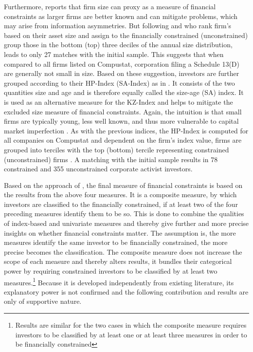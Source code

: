 \documentclass[12pt]{article}
\begin{document}
Furthermore, \citet[p.15]{heller2015} reports that firm size can proxy as a measure of financial constraints as larger firms are better known and can mitigate problems, which may arise from information asymmetries. But following \citet[p.1790]{Almeida2004} and \citet[p.215]{Moeller2004} who rank firm's based on their asset size and assign to the financially constrained (unconstrained) group those in the bottom (top) three deciles of the annual size distribution, leads to only 27 matches with the initial sample. This suggests that when compared to all firms listed on Compustat, corporation filing a Schedule 13(D) are generally not small in size. 
Based on these suggestion, investors are further grouped according to their HP-Index (SA-Index) as in \citet[p.1929]{hadlock2010}. It consists of the two quantities size and age and is therefore equally called the size-age (SA) index. It is used as an alternative measure for the KZ-Index and helps to mitigate the excluded size measure of financial constraints. Again, the intuition is that small firms are typically young, less well known, and thus more vulnerable to capital market imperfection \citep[p.1790]{Almeida2004}. As with the previous indices, the HP-Index is computed for all companies on Compustat and dependent on the firm's index value, firms are grouped into terciles with the top (bottom) tercile representing constrained (unconstrained) firms \citep[p.29]{Farre-mensa2013}. A matching with the initial sample results in 78 constrained and 355 unconstrained corporate activist investors.\par
Based on the approach of \citet[p.1188]{Campello2006}, the final measure of financial constraints is based on the results from the above four measures. It is a composite measure, by which investors are classified to the financially constrained, if at least two of the four preceding measures identify them to be so. This is done to combine the qualities of index-based and univariate measures and thereby give further and more precise insights on whether financial constraints matter. The assumption is, the more measures identify the same investor to be financially constrained, the more precise becomes the classification. The composite measure does not increase the scope of each measure and thereby alters results, it bundles their categorical power by requiring constrained investors to be classified by at least two measures.\footnote{Results are similar for the two cases in which the composite measure requires investors to be classified by at least one or at least three measures in order to be financially constrained} Because it is developed independently from existing literature, its explanatory power is not confirmed and the following contribution and results are only of supportive nature.
\end{document}
